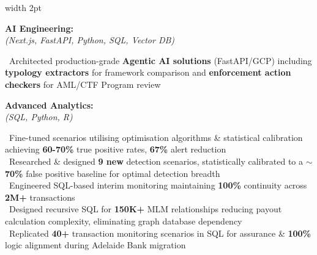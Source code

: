 \documentclass[11pt,a4paper]{article}
\newcommand{\linesection}[1]{%
  \vspace{10pt}%
  \noindent{\color{headerblue}\large\bfseries #1}\hspace{0.5em}{\color{sectionline}\leavevmode\leaders\hrule height 1.5pt\hfill\kern0pt}%
  \par\vspace{8pt}%
}
\begin{document}
\linesection{KEY SKILLS}

\noindent\begin{minipage}{\textwidth}
\hspace{2pt}\vrule width 2pt\hspace{15pt}%
\begin{minipage}[t]{\textwidth-19pt}

\noindent\begin{minipage}[t]{0.28\textwidth}
\textbf{\color{headerblue}AI Engineering:}\\[0pt]
\textit{(Next.js, FastAPI, Python, SQL, Vector DB)}
\end{minipage}%
\hfill%
\begin{minipage}[t]{0.68\textwidth}
\textbullet\ Architected production-grade \textbf{Agentic AI solutions} (FastAPI/GCP) including \textbf{typology extractors} for framework comparison and \textbf{enforcement action checkers} for AML/CTF Program review
\end{minipage}

\vspace{6pt}

\noindent\begin{minipage}[t]{0.28\textwidth}
\textbf{\color{headerblue}Advanced Analytics:}\\[0pt]
\textit{(SQL, Python, R)}
\end{minipage}%
\hfill%
\begin{minipage}[t]{0.68\textwidth}
\textbullet\ Fine-tuned scenarios utilising optimisation algorithms \& statistical calibration achieving \textbf{60-70\%} true positive rates, \textbf{67\%} alert reduction\\
\textbullet\ Researched \& designed \textbf{9 new} detection scenarios, statistically calibrated to a \textbf{$\sim$70\%} false positive baseline for optimal detection breadth\\
\textbullet\ Engineered SQL-based interim monitoring maintaining \textbf{100\%} continuity across \textbf{2M+} transactions\\
\textbullet\ Designed recursive SQL for \textbf{150K+} MLM relationships reducing payout calculation complexity, eliminating graph database dependency\\
\textbullet\ Replicated \textbf{40+} transaction monitoring scenarios in SQL for assurance \& \textbf{100\%} logic alignment during Adelaide Bank migration
\end{minipage}


\end{minipage}
\end{minipage}
\end{document}
